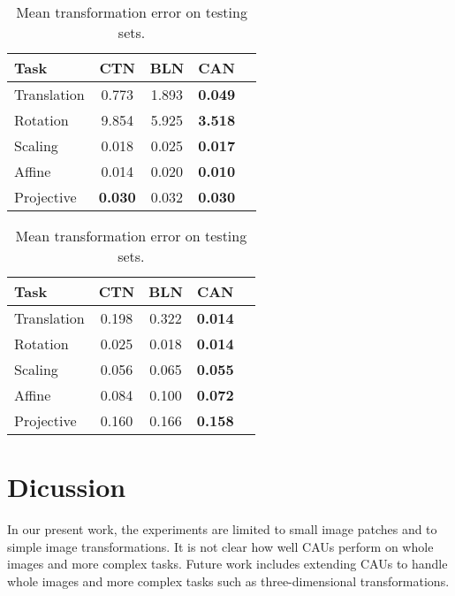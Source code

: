 \documentclass[conference]{IEEEtran}
\begin{document}
\begin{table}[h!]

\begin{center}
\caption{Mean parameter error on testing sets.}
\label{VE}
\begin{small}
\begin{tabular}{lcccc}
\hline
Task &   CTN & BLN & CAN \\
\hline
Translation &   0.773 & 1.893 & \textbf{0.049} \\
Rotation &   9.854 & 5.925 & \textbf{3.518}   \\
Scaling &  0.018 & 0.025 & \textbf{0.017}     \\
Affine &   0.014 & 0.020 & \textbf{0.010}  \\
Projective &  \textbf{0.030}  & 0.032 & \textbf{0.030} \\
\hline
\end{tabular}
\end{small}
\end{center}


\begin{center}
\caption{Mean transformation error on testing sets.}
\label{TE}
\begin{small}
\begin{tabular}{lcccc}
\hline
Task  & CTN & BLN & CAN \\
\hline
Translation &   0.198 & 0.322 & \textbf{0.014} \\
Rotation &   0.025 & 0.018 & \textbf{0.014}   \\ 
Scaling &  0.056 & 0.065 & \textbf{0.055}     \\
Affine &  0.084 & 0.100 & \textbf{0.072}  \\
Projective & 0.160 & 0.166 & \textbf{0.158} \\
\hline
\end{tabular}
\end{small}
\end{center}

\end{table}


\section{Dicussion}\label{sec:conclusion}
In our present work, the experiments are limited to small image patches and to simple image transformations. It is not clear how well CAUs perform on whole images and more complex tasks. Future work includes extending CAUs to handle whole images and more complex tasks such as three-dimensional transformations.
\end{document}
